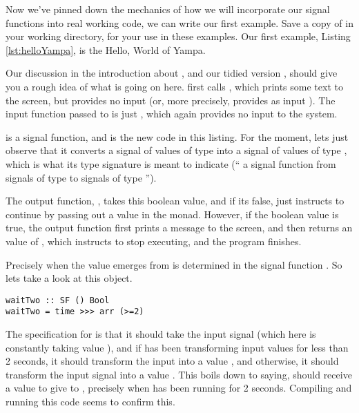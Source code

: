 Now we've pinned down the mechanics of how we will incorporate our signal functions into real working code, we can write our first example. Save a copy of  in your working directory, for your use in these examples. Our first example, Listing \ref{lst:helloYampa}, is the Hello, World of Yampa.



Our discussion in the introduction about , and our tidied version \yampaMain, should give you a rough idea of what is going on here. \yampaMain first calls , which prints some text to the screen, but provides no input (or, more precisely, provides as input \hask{()}). The input function passed to \yampaMain is just , which again provides no input to the system.

 is a signal function, and is the new code in this listing. For the moment, lets just observe that it converts a signal of values of type \hask{()} into a signal of values of type , which is what its type signature  is meant to indicate (`` a signal function from signals of type \hask{()} to signals of type '').

The output function, , takes this boolean value, and if its false, just instructs \yampaMain to continue by passing out a  value in the  monad. However, if the boolean value is true, the output function first prints a message to the screen, and then returns an  value of , which instructs \yampaMain to stop executing, and the program finishes.

Precisely when the value  emerges from \yampaMain is determined in the signal function . So lets take a look at this object.

\begin{lstlisting}
waitTwo :: SF () Bool
waitTwo = time >>> arr (>=2)
\end{lstlisting}

The specification for  is that it should take the input signal (which here is constantly taking value \hask{()}), and if  has been transforming input values for less than 2 seconds, it should transform the input into a value , and otherwise, it should transform the input signal into a value . This boils down to saying, \yampaMain should receive a value  to give to , precisely when \yampaMain has been running for 2 seconds. Compiling and running this code seems to confirm this.

